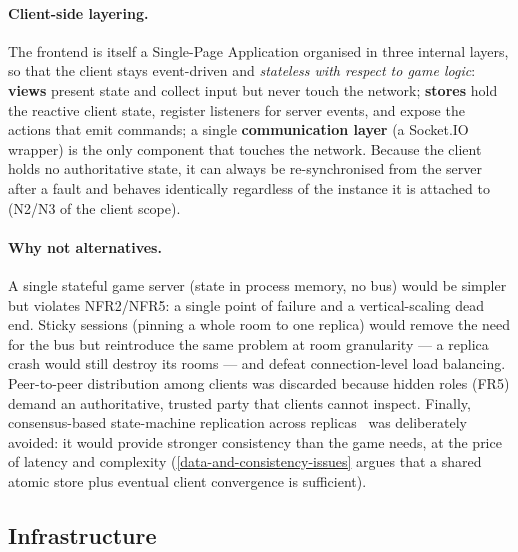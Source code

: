 \documentclass{scrartcl}
\begin{document}
\paragraph{Client-side layering.}
The frontend is itself a Single-Page Application organised in three internal
layers, so that the client stays event-driven and \emph{stateless with respect
      to game logic}: \textbf{views} present state and collect input but never touch
the network; \textbf{stores} hold the reactive client state, register listeners
for server events, and expose the actions that emit commands; a single
\textbf{communication layer} (a Socket.IO wrapper) is the only component that
touches the network. Because the client holds no authoritative state, it can
always be re-synchronised from the server after a fault and behaves identically
regardless of the instance it is attached to (N2/N3 of the client scope).

\paragraph{Why not alternatives.}
A single stateful game server (state in process memory, no bus) would be simpler
but violates NFR2/NFR5: a single point of failure and a vertical-scaling dead
end. Sticky sessions (pinning a whole room to one replica) would remove the need
for the bus but reintroduce the same problem at room granularity --- a replica
crash would still destroy its rooms --- and defeat connection-level load
balancing. Peer-to-peer distribution among clients was discarded because hidden
roles (FR5) demand an authoritative, trusted party that clients cannot inspect.
Finally, consensus-based state-machine replication across
replicas~\cite{schneider1990implementing} was deliberately avoided: it would
provide stronger consistency than the game needs, at the price of latency and
complexity (\cref{data-and-consistency-issues} argues that a shared atomic store
plus eventual client convergence is sufficient).

\subsection{Infrastructure}\label{infrastructure}
\end{document}
